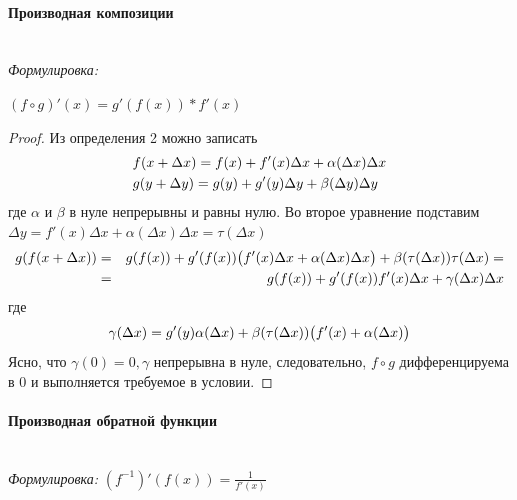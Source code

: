\documentclass{article}
\let\vanillaparagraph\paragraph
\renewcommand{\paragraph}[1]{\vanillaparagraph{#1}\mbox{}\\}
\begin{document}
\paragraph{Производная композиции}

\textit{Формулировка: }

$(f \circ g)'(x) = g'(f(x)) * f'(x)$

\begin{proof}
Из определения 2 можно записать
\begin{eqnarray}
&f(x + \Delta x)=f(x) + f'(x)\Delta x + \alpha(\Delta x)\Delta x \notag \\
&g(y + \Delta y)=g(y) + g'(y)\Delta y + \beta(\Delta y)\Delta y \notag
\end{eqnarray}
где $\alpha$ и $\beta$ в нуле непрерывны и равны нулю. Во второе уравнение подставим\\ $\Delta y = f'(x)\Delta x + \alpha(\Delta x)\Delta x = \tau(\Delta x)$
\begin{eqnarray}
g(f(x + \Delta x)) &=& g(f(x)) + g'(f(x))\big(f'(x)\Delta x + \alpha(\Delta x)\Delta x\big) + \beta(\tau(\Delta x))\tau(\Delta x) =\notag\\
&=& g(f(x)) + g'(f(x))f'(x)\Delta x + \gamma(\Delta x)\Delta x \notag
\end{eqnarray}
где
\begin{equation}
\gamma (\Delta x) = g'(y)\alpha(\Delta x) + \beta(\tau(\Delta x)) \big(f'(x) + \alpha(\Delta x)\big)\notag
\end{equation}
Ясно, что $\gamma(0) = 0, \gamma$ непрерывна в нуле, следовательно, $f \circ g$ дифференцируема в 0 и выполняется требуемое в условии.
\end{proof}

\paragraph{Производная обратной функции}

\textit{Формулировка: }
$(f^{-1})'(f(x)) = \frac{1} {f'(x)}$
\end{document}
